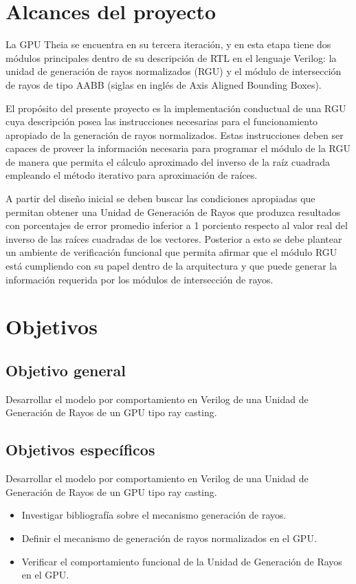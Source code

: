 \section{Alcances del proyecto}

La GPU Theia se encuentra en su tercera iteración, y en esta etapa tiene dos módulos principales dentro de su descripción de RTL en el lenguaje Verilog: la unidad de generación de rayos normalizados (RGU) y el módulo de intersección de rayos de tipo AABB (siglas en inglés de Axis Aligned Bounding Boxes).

El propósito del presente proyecto es la implementación conductual de una RGU cuya descripción posea las instrucciones necesarias para el funcionamiento apropiado de la generación de rayos normalizados. Estas instrucciones deben ser capaces de proveer la información necesaria para programar el módulo de la RGU de manera que permita el cálculo aproximado del inverso de la raíz cuadrada empleando el método iterativo para aproximación de raíces.

A partir del diseño inicial se deben buscar las condiciones apropiadas que permitan obtener una Unidad de Generación de Rayos que produzca resultados con porcentajes de error promedio inferior a 1 porciento respecto al valor real del inverso de las raíces cuadradas de los vectores. 
Posterior a esto se debe plantear un ambiente de verificación funcional que permita afirmar que el módulo RGU está cumpliendo con su papel dentro de la arquitectura y que puede generar la información requerida por los módulos de intersección de rayos.

\section{Objetivos}

\subsection{Objetivo general}
 Desarrollar el modelo por comportamiento en Verilog de una Unidad de Generación de Rayos de un GPU tipo ray casting.


\subsection{Objetivos específicos}
 Desarrollar el modelo por comportamiento en Verilog de una Unidad de Generación de Rayos de un GPU tipo ray casting.

\begin{itemize} %
	\item Investigar bibliografía sobre el mecanismo generación de rayos.
	\item Definir el mecanismo de generación de rayos normalizados en el GPU.
	\item Verificar el comportamiento funcional de la Unidad de Generación de Rayos en el GPU.
\end{itemize}
 
